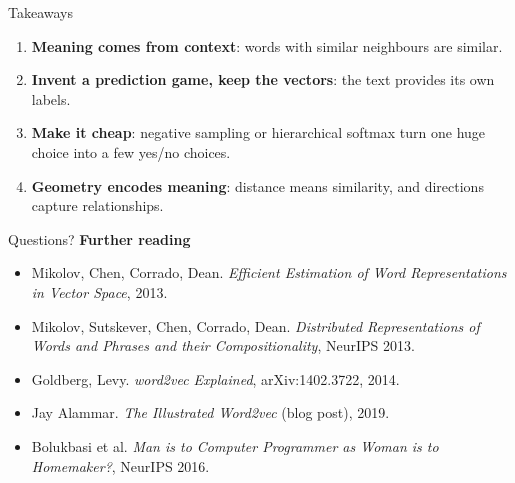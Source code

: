 \documentclass[aspectratio=169,11pt]{beamer}
\begin{document}
\begin{frame}{Takeaways}
  \begin{enumerate}
    \setlength{\itemsep}{10pt}
    \item<1-> \textbf{Meaning comes from context}: words with similar neighbours are similar.
    \item<2-> \textbf{Invent a prediction game, keep the vectors}: the text provides its own labels.
    \item<3-> \textbf{Make it cheap}: negative sampling or hierarchical softmax turn one huge choice into a few yes/no choices.
    \item<4-> \textbf{Geometry encodes meaning}: distance means similarity, and directions capture relationships.
  \end{enumerate}
\end{frame}

\begin{frame}{Questions?}
  \vspace{4mm}
  \textbf{Further reading}\\[4pt]
  \small
  \begin{itemize}
    \setlength{\itemsep}{4pt}
    \item Mikolov, Chen, Corrado, Dean. \emph{Efficient Estimation of Word Representations in Vector Space}, 2013.
    \item Mikolov, Sutskever, Chen, Corrado, Dean. \emph{Distributed Representations of Words and Phrases and their Compositionality}, NeurIPS 2013.
    \item Goldberg, Levy. \emph{word2vec Explained}, arXiv:1402.3722, 2014.
    \item Jay Alammar. \emph{The Illustrated Word2vec} (blog post), 2019.
    \item Bolukbasi et al. \emph{Man is to Computer Programmer as Woman is to Homemaker?}, NeurIPS 2016.
  \end{itemize}
\end{frame}
\end{document}
